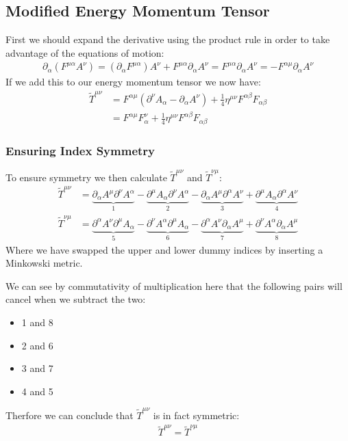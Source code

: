 \documentclass[12pt]{article}
\newcommand{\D}{\partial}
\begin{document}
\subsection{Modified Energy Momentum Tensor}
First we should expand the derivative using the product rule in order to take advantage of the equations of motion:
\begin{align*}
  \D_\alpha(F^{\mu\alpha}A^\nu)=(\D_\alpha F^{\mu\alpha})A^\nu+
  F^{\mu\alpha}\D_\alpha A^\nu=F^{\mu\alpha}\D_\alpha A^\nu=-F^{\alpha\mu}
  \D_\alpha A^\nu
\end{align*}
If we add this to our energy momentum tensor we now have:
\begin{align*}
  \tilde{T}^{\mu\nu}&=F^{\alpha\mu}(\D^\nu A_\alpha-\D_\alpha A^\nu)
  +\frac14\eta^{\mu\nu}F^{\alpha\beta}F_{\alpha\beta}\\
  &=F^{\alpha\mu}F^\nu_\alpha+\frac14\eta^{\mu\nu}F^{\alpha\beta}F_{\alpha\beta}
\end{align*}

\subsubsection{Ensuring Index Symmetry}
To ensure symmetry we then calculate $\tilde{T}^{\mu\nu}$ and $\tilde{T}^{\nu\mu}$:
\begin{align*}
  \tilde{T}^{\mu\nu}&=
  \underbrace{\D_\alpha A^\mu\D^\nu A^\alpha}_1
  -\underbrace{\D^\mu A_\alpha\D^\nu A^\alpha}_2
  -\underbrace{\D_\alpha A^\mu\D^\alpha A^\nu}_3
  +\underbrace{\D^\mu A_\alpha\D^\alpha A^\nu}_4\\
  \tilde{T}^{\nu\mu}&=
  \underbrace{\D^\alpha A^\nu\D^\mu A_\alpha}_5
  -\underbrace{\D^\nu A^\alpha\D^\mu A_\alpha}_6
  -\underbrace{\D^\alpha A^\nu\D_\alpha A^\mu}_7
  +\underbrace{\D^\nu A^\alpha\D_\alpha A^\mu}_8
\end{align*}
Where we have swapped the upper and lower dummy indices by inserting a Minkowski metric.

We can see by commutativity of multiplication here that the following pairs will cancel when we subtract the two:
\begin{center}
  \begin{varwidth}{\textwidth}
    \begin{itemize}
    \item 1 and 8
    \item 2 and 6
    \item 3 and 7
    \item 4 and 5
    \end{itemize}
  \end{varwidth}
\end{center}
Therfore we can conclude that $\tilde{T}^{\mu\nu}$ is in fact symmetric:
\begin{align*}
  \boxed{\tilde{T}^{\mu\nu}=\tilde{T}^{\nu\mu}}
\end{align*}
\end{document}
